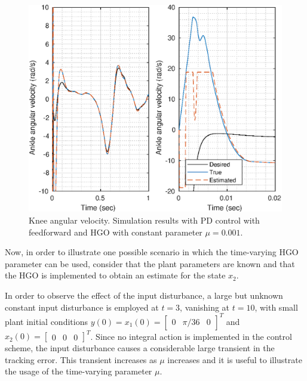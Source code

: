 \documentclass[letterpaper, 10 pt, conference]{ieeeconf}  %
\theoremstyle{plain}
\theoremstyle{definition}
\theoremstyle{remark}
\begin{document}
%
%
\begin{figure}[h!]
	\begin{center}
	\includegraphics[width = 13cm]{Figs/dq_ankle_mu_1e-03.eps}
	\caption{Knee angular velocity. Simulation results with PD control with feedforward and HGO with constant parameter $\mu=0.001$.}
	\label{fig:dankle}
	\end{center}
	\end{figure}
Now, in order to illustrate one possible scenario in which the time-varying HGO parameter can be used, consider that the plant parameters are known and that the HGO is implemented to obtain an estimate for the state $x_2$. 


In order to observe the effect of the input disturbance, a large but unknown constant input disturbance is employed at $t=3$, vanishing at $t=10$, with small plant initial conditions  $y(0)=x_1(0)=\left[\begin{array}{ccc} 0  & \pi/36 & 0\end{array} \right ]^T$ and $x_2(0)=\left[\begin{array}{ccc} 0  & 0 & 0\end{array} \right ]^T$. Since no integral action is implemented in the control scheme, the input disturbance causes a considerable large transient in the tracking error. This transient increases as $\mu$ increases and it is useful to illustrate the usage of the time-varying parameter $\mu$.
\end{document}
